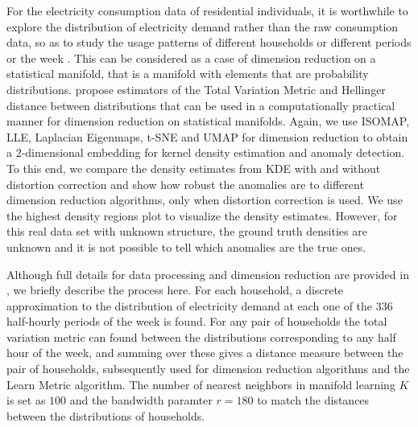 \documentclass[11pt,a4paper,]{article}
\begin{document}
For the electricity consumption data of residential individuals, it is worthwhile to explore the distribution of electricity demand rather than the raw consumption data, so as to study the usage patterns of different households or different periods or the week \autocite{Hyndman2018-ia}. This can be considered as a case of dimension reduction on a statistical manifold, that is a manifold with elements that are probability distributions. \textcite{Cheng2021-dh} propose estimators of the Total Variation Metric and Hellinger distance between distributions that can be used in a computationally practical manner for dimension reduction on statistical manifolds. Again, we use ISOMAP, LLE, Laplacian Eigenmaps, t-SNE and UMAP for dimension reduction to obtain a \(2\)-dimensional embedding for kernel density estimation and anomaly detection. To this end, we compare the density estimates from KDE with and without distortion correction and show how robust the anomalies are to different dimension reduction algorithms, only when distortion correction is used. We use the highest density regions plot to visualize the density estimates. However, for this real data set with unknown structure, the ground truth densities are unknown and it is not possible to tell which anomalies are the true ones.

Although full details for data processing and dimension reduction are provided in \textcite{Cheng2021-dh}, we briefly describe the process here. For each household, a discrete approximation to the distribution of electricity demand at each one of the \(336\) half-hourly periods of the week is found. For any pair of households the total variation metric can found between the distributions corresponding to any half hour of the week, and summing over these gives a distance measure between the pair of households, subsequently used for dimension reduction algorithms and the Learn Metric algorithm. The number of nearest neighbors in manifold learning \(K\) is set as \(100\) and the bandwidth paramter \(r=180\) to match the distances between the distributions of households.
\end{document}
